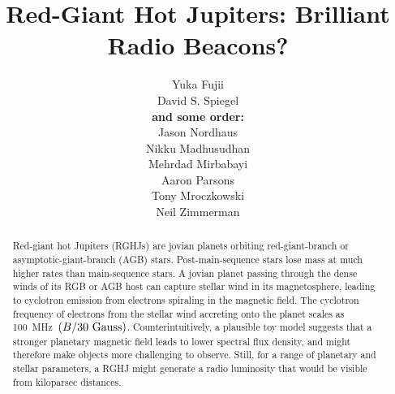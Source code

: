 \documentclass{emulateapj}
\begin{document}

\title{Red-Giant Hot Jupiters: Brilliant Radio Beacons?}

\author{
%
Yuka Fujii \\
%
David S. Spiegel \\
%
{\bf and some order:} \\
%
Jason Nordhaus \\
%
Nikku Madhusudhan \\
%
Mehrdad Mirbabayi \\
%
Aaron Parsons \\
%
Tony Mroczkowski \\
%
Neil Zimmerman
}

  








\vspace{0.5\baselineskip}



\begin{abstract}
  Red-giant hot Jupiters (RGHJs) are jovian planets orbiting red-giant-branch or asymptotic-giant-branch (AGB) stars.
  Post-main-sequence stars lose mass at much higher rates than main-sequence stars.
  A jovian planet passing through the dense winds of its RGB or AGB host can capture stellar wind in its magnetosphere, leading to cyclotron emission from electrons spiraling in the magnetic field.
  The cyclotron frequency of electrons from the stellar wind accreting onto the planet scales as 100~MHz~$(B/30 {\rm~Gauss})$.
  Counterintuitively, a plausible toy model suggests that a stronger planetary magnetic field leads to lower spectral flux density, and might therefore make objects more challenging to observe.
  Still, for a range of planetary and stellar parameters, a RGHJ might generate a radio luminosity that would be visible from kiloparsec distances.
\end{abstract}
\end{document}
